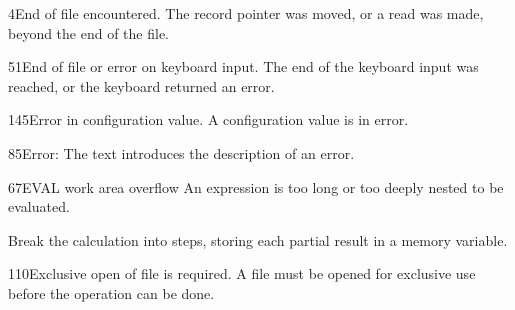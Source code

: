 \begin{XbaseMessageEntry}{4}{End of file encountered.}
The record pointer was moved, or a read was made, beyond the end of the file.
\end{XbaseMessageEntry}

\begin{XbaseMessageEntry}{51}{End of file or error on keyboard input.}
The end of the keyboard input was reached, or the keyboard returned an error.
\end{XbaseMessageEntry}

\begin{XbaseMessageEntry}{145}{Error in configuration value.}
A configuration value is in error.
\end{XbaseMessageEntry}

\begin{XbaseMessageEntry}{85}{Error:}
The text introduces the description of an error.
\end{XbaseMessageEntry}

\begin{XbaseMessageEntry}{67}{EVAL work area overflow}
An expression is too long or too deeply nested to be evaluated.

Break the calculation into steps, storing each partial result in a memory variable.
\end{XbaseMessageEntry}

\begin{XbaseMessageEntry}{110}{Exclusive open of file is required.}
A file must be opened for exclusive use before the operation can be done.
\end{XbaseMessageEntry}

